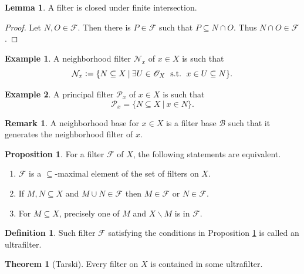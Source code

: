 \documentclass[10pt]{article}
\numberwithin{equation}{section}
\theoremstyle{definition}
\newtheorem{theorem}{Theorem} [subsection]
\newtheorem{proposition}{Proposition}[subsection]
\newtheorem{definition}{Definition}[subsection]
\newtheorem{lemma}{Lemma}[subsection]
\newtheorem{remark}{Remark}[subsection]
\newtheorem{example}{Example}[subsection]
\DeclareMathOperator{\straw}{s.t.}
\newcommand{\defeq}{\vcentcolon=}
\newcommand{\Ouv}{\mathscr{O}}
\newcommand{\F}[0]{\mathcal{F}}
\newcommand{\sep}[0]{\:|\:}
\newcommand{\st}[0]{\:\straw\:}
\begin{document}
\begin{lemma}
    A filter is closed under finite intersection.
\end{lemma}
\begin{proof}
    Let $N,O\in\mathcal{F}$. Then there is $P\in\mathcal{F}$ such that $P\subseteq N\cap O$. Thus $N\cap O\in\F$.
\end{proof}
\begin{example}
    \label{example_2}
A neighborhood filter $\mathcal{N}_x$ of $x\in X$ is such that
\begin{equation*}
    \mathcal{N}_x\defeq\{N\subseteq X\sep \exists U\in\Ouv_X\:\st\: x\in U\subseteq N\}.
\end{equation*}
\end{example}
\begin{example}
    \label{example_3}
    A principal filter $\mathcal{P}_x$ of $x\in X$ is such that
    \begin{equation*}
        \mathcal{P}_x=\{N\subseteq X\sep x\in N\}.
    \end{equation*}
\end{example}
\begin{remark}
    A neighborhood base for $x\in X$ is a filter base $\mathcal{B}$ such that it generates the neighborhood filter of $x$.
\end{remark}
\begin{proposition}
    \label{proposition_2_8}
    \label{fact_8}
    For a filter $\mathcal{F}$ of $X$, the following statements are equivalent.
    \begin{enumerate}[1.]
        \item $\mathcal{F}$ is a $\subseteq$-maximal element of the set of filters on $X$.
        \item If $M,N\subseteq X$ and $M\cup N\in\mathcal{F}$ then $M\in\mathcal{F}$ or $N\in\mathcal{F}$.
        \item For $M\subseteq X$, precisely one of $M$ and $X\backslash M$ is in $\mathcal{F}$.
    \end{enumerate}
\end{proposition}
\begin{definition}
    \label{definition_8}
    Such filter $\mathcal{F}$ satisfying the conditions in Proposition \ref{proposition_2_8} is called an ultrafilter.
\end{definition}
\begin{theorem}[Tarski]
    \label{theorem_tarski}
    Every filter on $X$ is contained in some ultrafilter.
\end{theorem}
\end{document}
